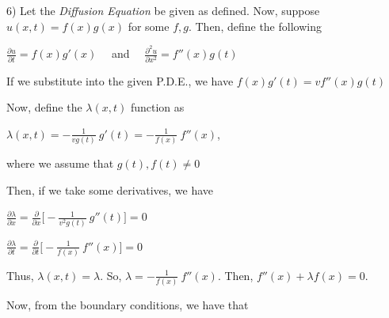 \documentclass[12pt, executivepaper]{article}
\begin{document}
\begin{flushleft}

6) Let the \textit{Diffusion Equation} be given as defined. Now, suppose $u(x,t)=f(x)g(x)$ for some $f,g$. Then, define the following

\begin{center}

$\frac{\partial u}{\partial t}=f(x)g'(x) \quad$ and  $\quad  \frac{\partial^2 u}{\partial x^2}=f''(x)g(t)$

\end{center}

If we substitute into the given P.D.E., we have $f(x)g'(t)=vf''(x)g(t)$

\vspace{2mm}

Now, define the $\lambda(x,t)$ function as

\begin{center}

$\lambda(x,t)=-\frac{1}{vg(t)} \ g'(t)=-\frac{1}{f(x)} \ f''(x)$, 

\vspace{2mm}

where we assume that $g(t), f(t) \neq 0$

\end{center}

Then, if we take some derivatives, we have

\pagebreak

\vspace*{-40mm}

\begin{center}

$\frac{\partial \lambda}{\partial x}=\frac{\partial}{\partial x} \bigg[-\frac{1}{v^2g(t)} \ g''(t)\bigg]=0$

\vspace{2mm}

$\frac{\partial \lambda}{\partial t}=\frac{\partial}{\partial t} \bigg[-\frac{1}{f(x)} \ f''(x)\bigg]=0$

\end{center}

Thus, $\lambda(x,t)=\lambda$. So, $\lambda=-\frac{1}{f(x)} \ f''(x)$. Then, $f''(x)+\lambda f(x)=0$.

\vspace{2mm}

Now, from the boundary conditions, we have that

\begin{center}


\end{center}
\end{flushleft}
\end{document}
